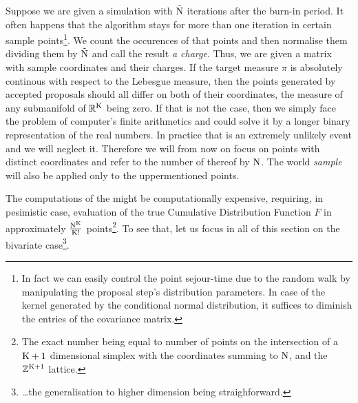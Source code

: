 Suppose we are given a simulation with $\tilde{\mathrm{N}}$ iterations after the burn-in period. It often happens that the algorithm stays for more than one iteration in certain sample points\footnote{In fact we can easily control the point sejour-time due to the random walk by manipulating the proposal step's distribution parameters. In case of the kernel generated by the conditional normal distribution, it suffices to diminish the entries of the covariance matrix.}. We count the occurences of that points and then normalise them dividing them by $\tilde{\mathrm{N}}$ and call the result {\it a charge}. Thus, we are given a matrix with sample coordinates and their charges. If the target measure $\pi$ is absolutely continous with respect to the Lebesgue measure, then the points generated by accepted proposals should all differ on both of their coordinates, the measure of any submanifold of $\mathbb{R}^{\mathrm{K}}$ being zero. If that is not the case, then we simply face the problem of computer's finite arithmetics and could solve it by a longer binary representation of the real numbers. In practice that is an extremely unlikely event and we will neglect it. Therefore we will from now on focus on points with distinct coordinates and refer to the number of thereof by $\mathrm{N}$. The world {\it sample} will also be applied only to the uppermentioned points. 

The computations of the \KS might be computationally expensive, requiring, in pesimistic case, evaluation of the true Cumulative Distribution Function $F$ in approximately $\frac{\mathrm{N}^{\mathrm{K}}}{\mathrm{K}!}$ points\footnote{The exact number being equal to number of points on the intersection of a $\mathrm{K}+1$ dimensional simplex with the coordinates summing to $\mathrm{N}$, and the $\mathbb{Z}^{\mathrm{K}+1}$ lattice.}. To see that, let us focus in all of this section on the bivariate case\footnote{\dots the generalisation to higher dimension being straighforward.}.   


